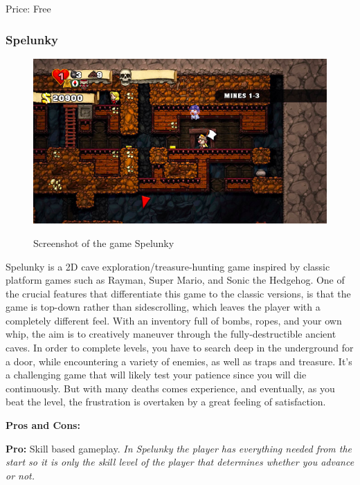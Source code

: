 \documentclass[12p]{article}
\begin{document}
Price: Free


\subsubsection{Spelunky}

\begin{figure}[ht]
  \center
  \includegraphics[width=1\textwidth]{StateOfTheArtScreenshots/spelunky}
  \label{StateOfTheArt_Screenshots_Spelunky}
  \caption{Screenshot of the game Spelunky \cite{SpelunkyScreenshot}}
\end{figure}

Spelunky is a 2D cave exploration/treasure-hunting game inspired by classic platform games such as Rayman, Super Mario, and Sonic the Hedgehog. One of the crucial features that differentiate this game to the classic versions, is that the game is top-down rather than sidescrolling, which leaves the player with a completely different feel. With an inventory full of bombs, ropes, and your own whip, the aim is to creatively maneuver through the fully-destructible ancient caves. In order to complete levels, you have to search deep in the underground for a door, while encountering a variety of enemies, as well as traps and treasure. It's a challenging game that will likely test your patience since you will die continuously. But with many deaths comes experience, and eventually, as you beat the level, the frustration is overtaken by a great feeling of satisfaction.

\textbf{Pros and Cons:}

\textbf{Pro:} Skill based gameplay. \emph{In Spelunky the player has everything needed from the start so it is only the skill level of the player that determines whether you advance or not.}
\end{document}
